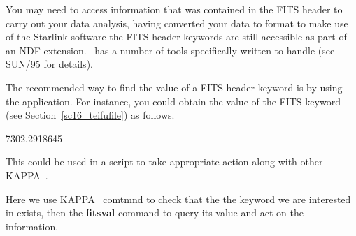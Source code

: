 \documentclass[twoside,11pt]{starlink}
\providecommand{\KAPPA}{{\footnotesize KAPPA}\normalsize}
\providecommand{\KAPPAref}{\xref{\KAPPA}{sun95}{}}
\begin{document}
You may need to access information that was contained in the FITS
header to carry out your data analysis, having converted your data to
 format to make use of the Starlink software the
FITS header keywords are still accessible as part of an NDF extension.
\KAPPAref\ has a number of tools specifically written to handle
 (see SUN/95 for
details).

The recommended way to find the value of a FITS header keyword is by
using the  application.  For instance, you
could obtain the value of the FITS keyword  (see
Section~\ref{sc16_teifufile}) as follows.

\begin{small}
\begin{terminalv}
7302.2918645
%
\end{terminalv}
\end{small}

This could be used in a script to take appropriate action along with
other \KAPPA\ .

\begin{small}
\end{small}

Here we use \KAPPA\  comtmnd to check
that the the keyword we are interested in exists, then the
\textbf{fitsval} command to query its value and act on
the information.
\end{document}
